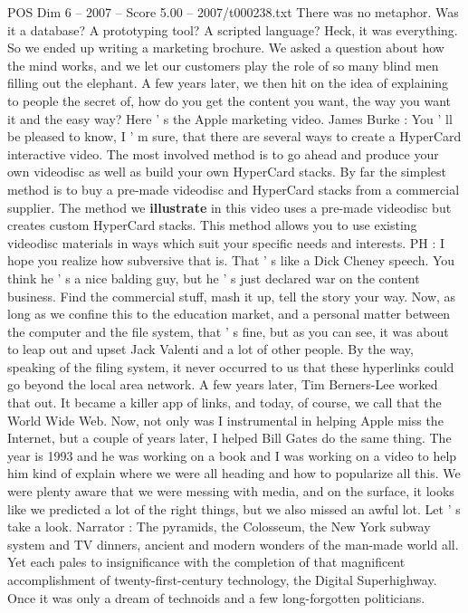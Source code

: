 \begin{textsample}{POS Dim 6 – 2007 – Score 5.00 – 2007/t000238.txt}
There was no metaphor.
Was it a database?
A prototyping tool?
A scripted language?
Heck, it was everything.
So we ended up writing a marketing brochure.
We asked a question about how the mind works, and we let our customers play the role of so many blind men filling out the elephant.
A few years later, we then hit on the idea of explaining to people the secret of, how do you get the content you want, the way you want it and the easy way?
Here ' s the Apple marketing video.
James Burke : You ' ll be pleased to know, I ' m sure, that there are several ways to create a HyperCard interactive video.
The most involved method is to go ahead and produce your own videodisc as well as build your own HyperCard stacks.
By far the simplest method is to buy a pre-made videodisc and HyperCard stacks from a commercial supplier.
The method we \textbf{illustrate} in this video uses a pre-made videodisc but creates custom HyperCard stacks.
This method allows you to use existing videodisc materials in ways which suit your specific needs and interests.
PH : I hope you realize how subversive that is.
That ' s like a Dick Cheney speech.
You think he ' s a nice balding guy, but he ' s just declared war on the content business.
Find the commercial stuff, mash it up, tell the story your way.
Now, as long as we confine this to the education market, and a personal matter between the computer and the file system, that ' s fine, but as you can see, it was about to leap out and upset Jack Valenti and a lot of other people.
By the way, speaking of the filing system, it never occurred to us that these hyperlinks could go beyond the local area network.
A few years later, Tim Berners-Lee worked that out.
It became a killer app of links, and today, of course, we call that the World Wide Web.
Now, not only was I instrumental in helping Apple miss the Internet, but a couple of years later, I helped Bill Gates do the same thing.
The year is 1993 and he was working on a book and I was working on a video to help him kind of explain where we were all heading and how to popularize all this.
We were plenty aware that we were messing with media, and on the surface, it looks like we predicted a lot of the right things, but we also missed an awful lot.
Let ' s take a look.
Narrator : The pyramids, the Colosseum, the New York subway system and TV dinners, ancient and modern wonders of the man-made world all.
Yet each pales to insignificance with the completion of that magnificent accomplishment of twenty-first-century technology, the Digital Superhighway.
Once it was only a dream of technoids and a few long-forgotten politicians.

\end{textsample}
